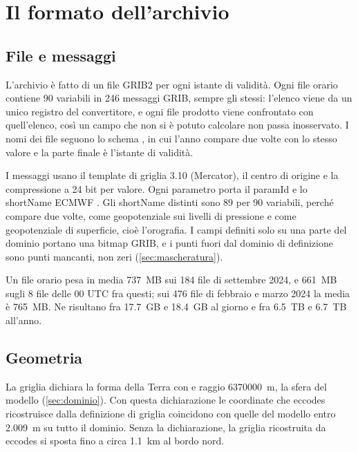 \chapter{Il formato dell'archivio}
\label{cap:formato}

\section{File e messaggi}
\label{sec:file}

L'archivio è fatto di un file GRIB2 per ogni istante di validità. Ogni file orario contiene 90
variabili in 246 messaggi GRIB, sempre gli stessi: l'elenco viene da un unico registro del
convertitore, e ogni file prodotto viene confrontato con quell'elenco, così un campo che non si è
potuto calcolare non passa inosservato. I nomi dei file seguono lo schema
, in cui l'anno compare due volte
con lo stesso valore e la parte finale è l'istante di validità.

I messaggi usano il template di griglia 3.10 (Mercator), il centro di origine  e la
compressione  a 24 bit per valore. Ogni parametro porta il paramId e lo
shortName ECMWF \parencite{paramdb}. Gli shortName distinti sono 89 per 90 variabili, perché
 compare due volte, come geopotenziale sui livelli di pressione e come geopotenziale di
superficie, cioè l'orografia. I campi definiti solo su una parte del dominio portano una bitmap
GRIB, e i punti fuori dal dominio di definizione sono punti mancanti, non zeri
(\cref{sec:mascheratura}).

Un file orario pesa in media \SI{737}{MB} sui 184 file di settembre 2024, e \SI{661}{MB} sugli 8
file delle 00 UTC fra questi; sui 476 file di febbraio e marzo 2024 la media è \SI{765}{MB}. Ne
risultano fra \SI{17.7}{GB} e \SI{18.4}{GB} al giorno e fra \SI{6.5}{TB} e \SI{6.7}{TB} all'anno.

\section{Geometria}
\label{sec:geometria}

La griglia dichiara la forma della Terra con  e raggio
\SI{6370000}{m}, la sfera del modello (\cref{sec:dominio}). Con questa dichiarazione le coordinate
che eccodes ricostruisce dalla definizione di griglia coincidono con quelle del modello entro
\SI{2.009}{m} su tutto il dominio. Senza la dichiarazione, la griglia ricostruita da eccodes si
sposta fino a circa \SI{1.1}{km} al bordo nord.

